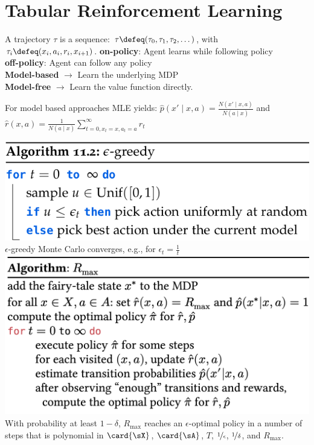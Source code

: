 \section{Tabular Reinforcement Learning}

A trajectory $\tau$ is a sequence: $\tau \defeq (\tau_0, \tau_1, \tau_2, \dots)$, with $\tau_i \defeq (x_i, a_i, r_i, x_{i+1})$.
\textbf{on-policy}: Agent learns while following policy \\
\textbf{off-policy}: Agent can follow any policy \\
\textbf{Model-based} $\rightarrow$ Learn the underlying MDP \\
\textbf{Model-free} $\rightarrow$ Learn the value function directly.
\begin{framed}
    For model based approaches MLE yields: ${\hat{p}(x' \mid x, a) = \frac{N(x' \mid x, a)}{N(a \mid x)}}$ and \\ ${\hat{r}(x, a) = \frac{1}{N(a \mid x)} \sum_{t = 0, x_t = x,a_t = a}^\infty r_t}$
\end{framed}
\includegraphics[width=\linewidth]{images/epsilon_greedy.png}
$\epsilon$-greedy Monte Carlo converges, e.g., for $\epsilon_t = \frac{1}{t}$
\includegraphics[width=0.95\linewidth]{images/R_max.png}
With probability at least $1-\delta$, $R_\mathrm{max}$ reaches an $\epsilon$-optimal policy in a number of steps that is polynomial in $\card{\sX}$, $\card{\sA}$, $T$, $\nicefrac{1}{\epsilon}$, $\nicefrac{1}{\delta}$, and $R_\mathrm{max}$.
